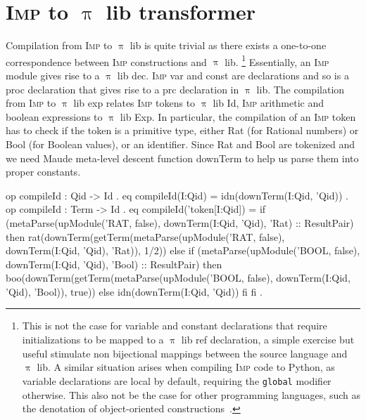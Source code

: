 \documentclass[a4paper,openany]{book}
\begin{document}
\section{\textsc{Imp} to $\uppi$ lib transformer}

Compilation from \textsc{Imp} to $\uppi$ lib is quite trivial as there exists a one-to-one correspondence between \textsc{Imp} constructions and $\uppi$ lib. \footnote{This is not the case for variable and constant declarations that require initializations to be mapped to a $\uppi$ lib ref declaration, a simple exercise but useful stimulate non bijectional mappings between the source language and $\uppi$ lib. A similar situation arises when compiling \textsc{Imp} code to Python, as variable declarations are local by default, requiring the \texttt{global} modifier otherwise. This also not be the case for other programming languages, such as the denotation of object-oriented constructions~\cite{msc-chalub}.} Essentially, an \textsc{Imp} module gives rise to a $\uppi$ lib dec. \textsc{Imp} var and const are declarations and so is a proc declaration that gives rise to a prc declaration in $\uppi$ lib. 
%
%
The compilation from \textsc{Imp} to $\uppi$ lib exp relates \textsc{Imp} tokens to $\uppi$ lib Id, \textsc{Imp} arithmetic and boolean expressions to $\uppi$ lib Exp. In particular, the compilation of an \textsc{Imp} token 
has to check if the token is a primitive type, either Rat (for Rational numbers) or Bool (for Boolean values), or an identifier. Since Rat and Bool are tokenized and we need Maude meta-level descent function downTerm to help us parse them into proper constants. 
\begin{maude}
 op compileId : Qid -> Id .
 eq compileId(I:Qid) = idn(downTerm(I:Qid, 'Qid)) .
 op compileId : Term -> Id .
 eq compileId('token[I:Qid]) =
    if (metaParse(upModule('RAT, false), 
         downTerm(I:Qid, 'Qid), 'Rat)  :: ResultPair)
    then rat(downTerm(getTerm(metaParse(upModule('RAT, false),
	      downTerm(I:Qid, 'Qid), 'Rat)), 1/2))
    else
      if (metaParse(upModule('BOOL, false), 
           downTerm(I:Qid, 'Qid), 'Bool) :: ResultPair)
      then boo(downTerm(getTerm(metaParse(upModule('BOOL, false),
		    downTerm(I:Qid, 'Qid), 'Bool)), true))
      else idn(downTerm(I:Qid, 'Qid))
      fi
    fi .
\end{maude}
\end{document}
